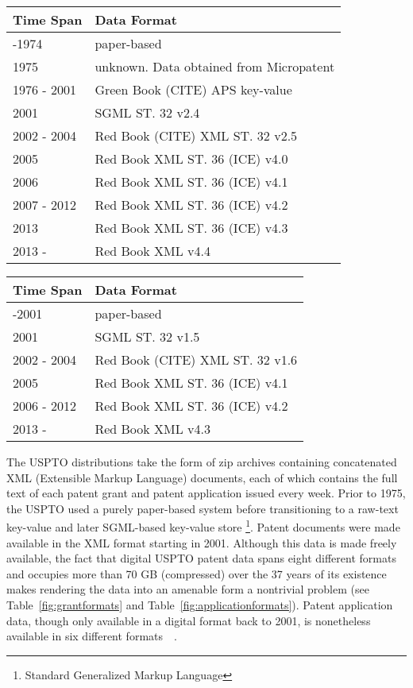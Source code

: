 \begin{table*}[t]
\center %
\begin{tabular}{|l|l|}
\hline 
Time Span  & Data Format \tabularnewline
\hline 
-1974  & paper-based \tabularnewline
1975  & unknown. Data obtained from Micropatent \tabularnewline
1976 - 2001  & Green Book (CITE) APS key-value \tabularnewline
2001  & SGML ST. 32 v2.4 \tabularnewline
2002 - 2004  & Red Book (CITE) XML ST. 32 v2.5 \tabularnewline
2005  & Red Book XML ST. 36 (ICE) v4.0 \tabularnewline
2006  & Red Book XML ST. 36 (ICE) v4.1 \tabularnewline
2007 - 2012  & Red Book XML ST. 36 (ICE) v4.2 \tabularnewline
2013  & Red Book XML ST. 36 (ICE) v4.3 \tabularnewline
2013 -  & Red Book XML v4.4 \tabularnewline
\hline 
\end{tabular}\caption{Table of USPTO grant data formats}


\label{fig:grantformats} 
\end{table*}
\begin{table*}[t]
\center %
\begin{tabular}{|l|l|}
\hline 
Time Span  & Data Format \tabularnewline
\hline 
-2001 & paper-based \tabularnewline
2001  & SGML ST. 32 v1.5\tabularnewline
2002 - 2004  & Red Book (CITE) XML ST. 32 v1.6 \tabularnewline
2005  & Red Book XML ST. 36 (ICE) v4.1 \tabularnewline
2006 - 2012 & Red Book XML ST. 36 (ICE) v4.2 \tabularnewline
2013 -  & Red Book XML v4.3\tabularnewline
\hline 
\end{tabular}\caption{Table of USPTO grant data formats}


\label{fig:applicationformats} 
\end{table*}


The USPTO distributions take the form of zip archives containing concatenated
XML (Extensible Markup Language) documents, each of which contains
the full text of each patent grant and patent application issued every
week. Prior to 1975, the USPTO used a purely paper-based system before
transitioning to a raw-text key-value and later SGML-based key-value
store %
\footnote{Standard Generalized Markup Language%
}. Patent documents were made available in the XML format starting
in 2001. Although this data is made freely available, the fact that
digital USPTO patent data spans eight different formats and occupies
more than 70 GB (compressed) over the 37 years of its existence makes
rendering the data into an amenable form a nontrivial problem (see
Table~\ref{fig:grantformats} and Table~\ref{fig:applicationformats}).
Patent application data, though only available in a digital format
back to 2001, is nonetheless available in six different formats~\cite{xmlresources}~\cite{xmlretrospective}.
